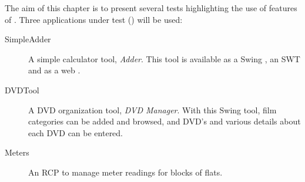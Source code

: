 
The aim of this chapter is to present several tests highlighting the use of  features of \GD{}. Three applications under test (\gdauts) will be used:


\begin{description}
\item[SimpleAdder]{ A simple calculator tool, \emph{Adder}. This tool is available as a Swing \gdaut{}, an SWT \gdaut{} and as a web \gdaut{}. }
\item [DVDTool]{A DVD organization tool, \emph{DVD Manager}. With this Swing tool, film categories can be added and browsed, and DVD's and various details about each DVD can be entered.}  
\item [Meters]{An RCP \gdaut{} to manage meter readings for blocks of flats.}
\end{description}


